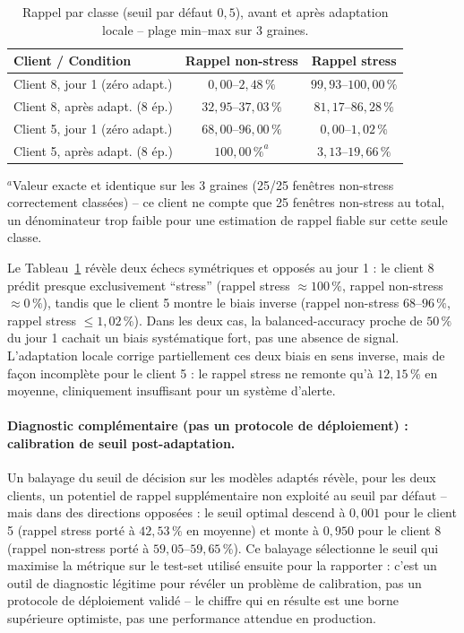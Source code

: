 \documentclass{acmart}
\begin{document}
\begin{table}[h!]
\centering
\small
\caption{Rappel par classe (seuil par défaut $0{,}5$), avant et après adaptation
locale -- plage min--max sur 3 graines.}
\label{tab:recall}
\begin{tabular}{lcc}
\toprule
Client / Condition & Rappel non-stress & Rappel stress \\
\midrule
Client 8, jour 1 (zéro adapt.)  & $0{,}00$--$2{,}48\,\%$   & $99{,}93$--$100{,}00\,\%$ \\
Client 8, après adapt. (8 ép.)  & $32{,}95$--$37{,}03\,\%$ & $81{,}17$--$86{,}28\,\%$ \\
Client 5, jour 1 (zéro adapt.)  & $68{,}00$--$96{,}00\,\%$ & $0{,}00$--$1{,}02\,\%$ \\
Client 5, après adapt. (8 ép.)  & $100{,}00\,\%^{a}$       & $3{,}13$--$19{,}66\,\%$ \\
\bottomrule
\end{tabular}

\vspace{2pt}
{\footnotesize $^{a}$Valeur exacte et identique sur les 3 graines (25/25 fenêtres
non-stress correctement classées) -- ce client ne compte que 25 fenêtres non-stress
au total, un dénominateur trop faible pour une estimation de rappel fiable sur cette
seule classe.}
\end{table}

Le Tableau~\ref{tab:recall} révèle deux échecs symétriques et opposés au jour 1 : le
client 8 prédit presque exclusivement ``stress'' (rappel stress $\approx100\,\%$,
rappel non-stress $\approx0\,\%$), tandis que le client 5 montre le biais inverse
(rappel non-stress $68$--$96\,\%$, rappel stress $\leq1{,}02\,\%$). Dans les deux cas,
la balanced-accuracy proche de $50\,\%$ du jour 1 cachait un biais systématique fort,
pas une absence de signal. L'adaptation locale corrige partiellement ces deux biais en
sens inverse, mais de façon incomplète pour le client 5 : le rappel stress ne remonte
qu'à $12{,}15\,\%$ en moyenne, cliniquement insuffisant pour un système d'alerte.

\paragraph{Diagnostic complémentaire (pas un protocole de déploiement) : calibration de
seuil post-adaptation.} Un balayage du seuil de décision sur les modèles adaptés révèle,
pour les deux clients, un potentiel de rappel supplémentaire non exploité au seuil par
défaut -- mais dans des directions opposées : le seuil optimal descend à $0{,}001$ pour
le client 5 (rappel stress porté à $42{,}53\,\%$ en moyenne) et monte à $0{,}950$ pour
le client 8 (rappel non-stress porté à $59{,}05$--$59{,}65\,\%$). Ce balayage sélectionne
le seuil qui maximise la métrique sur le test-set utilisé ensuite pour la rapporter :
c'est un outil de diagnostic légitime pour révéler un problème de calibration, pas un
protocole de déploiement validé -- le chiffre qui en résulte est une borne supérieure
optimiste, pas une performance attendue en production.
\end{document}
